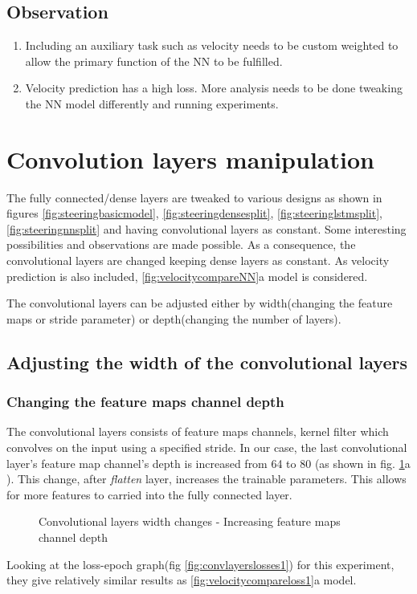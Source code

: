\subsection*{Observation}
\begin{enumerate}
    \item Including an auxiliary task such as velocity needs to be custom weighted to
        allow the primary function of the NN to be fulfilled.
    \item Velocity prediction has a high loss. More analysis needs to be done tweaking the
        NN model differently and running experiments.
\end{enumerate}
\section{Convolution layers manipulation}
The fully connected/dense layers are tweaked to various designs as shown in
figures \ref{fig:steeringbasicmodel}, \ref{fig:steeringdensesplit},
\ref{fig:steeringlstmsplit}, \ref{fig:steeringnnsplit} and having convolutional layers as
constant. Some interesting possibilities and observations are made possible. As a
consequence, the convolutional layers are changed keeping dense layers as constant.
As velocity prediction is also included, \ref{fig:velocitycompareNN}{a} model is
considered.

The convolutional layers can be adjusted either by width(changing the feature maps or
stride parameter) or depth(changing the number of layers).
\subsection{Adjusting the width of the convolutional layers}
\subsubsection*{Changing the feature maps channel depth}
The convolutional layers consists of feature maps channels, kernel filter which convolves
on the input using a specified stride. In our case, the last convolutional layer's feature
map channel's depth is increased from 64 to 80 (as shown in fig. \ref{fig:convlayerschange1}a ). This change, after \textit{flatten} layer,
increases the trainable parameters. This allows for more features to carried into the fully connected layer.
\begin{figure}[!ht]
    \def\svgwidth{1\textwidth}
    \caption{Convolutional layers width changes - Increasing feature maps channel depth}
    \label{fig:convlayerschange1}
\end{figure}
Looking at the loss-epoch graph(fig \ref{fig:convlayerslosses1}) for this experiment, they
give relatively similar results as \ref{fig:velocitycompareloss1}a model.
